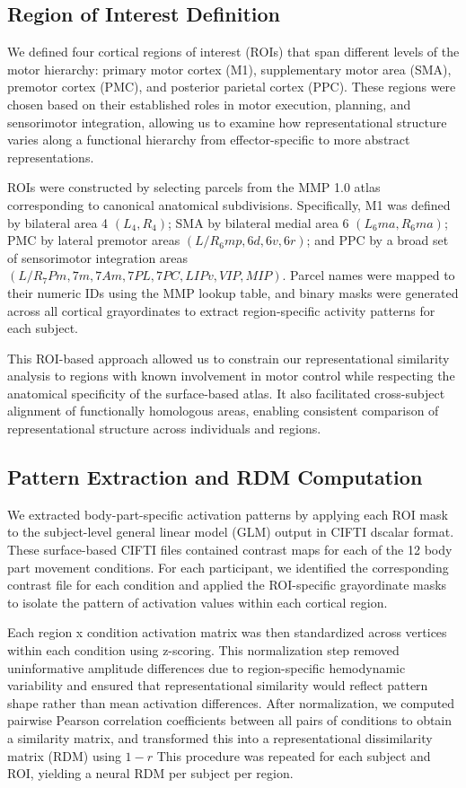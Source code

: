 \documentclass{article}
\begin{document}
\subsection{Region of Interest Definition}
We defined four cortical regions of interest (ROIs) that span different levels of the motor hierarchy: primary motor cortex (M1), supplementary motor area (SMA), premotor cortex (PMC), and posterior parietal cortex (PPC). These regions were chosen based on their established roles in motor execution, planning, and sensorimotor integration, allowing us to examine how representational structure varies along a functional hierarchy from effector-specific to more abstract representations.

ROIs were constructed by selecting parcels from the MMP 1.0 atlas corresponding to canonical anatomical subdivisions. Specifically, M1 was defined by bilateral area 4 $(L_4, R_4)$; SMA by bilateral medial area 6 $(L_6ma, R_6ma)$; PMC by lateral premotor areas $(L/R_6mp, 6d, 6v, 6r)$; and PPC by a broad set of sensorimotor integration areas $(L/R_7Pm, 7m, 7Am, 7PL, 7PC, LIPv, VIP, MIP)$. Parcel names were mapped to their numeric IDs using the MMP lookup table, and binary masks were generated across all cortical grayordinates to extract region-specific activity patterns for each subject.

This ROI-based approach allowed us to constrain our representational similarity analysis to regions with known involvement in motor control while respecting the anatomical specificity of the surface-based atlas. It also facilitated cross-subject alignment of functionally homologous areas, enabling consistent comparison of representational structure across individuals and regions.

\subsection{Pattern Extraction and RDM Computation}
We extracted body-part-specific activation patterns by applying each ROI mask to the subject-level general linear model (GLM) output in CIFTI dscalar format. These surface-based CIFTI files contained contrast maps for each of the 12 body part movement conditions. For each participant, we identified the corresponding contrast file for each condition and applied the ROI-specific grayordinate masks to isolate the pattern of activation values within each cortical region.

Each region x condition activation matrix was then standardized across vertices within each condition using z-scoring. This normalization step removed uninformative amplitude differences due to region-specific hemodynamic variability and ensured that representational similarity would reflect pattern shape rather than mean activation differences. After normalization, we computed pairwise Pearson correlation coefficients between all pairs of conditions to obtain a similarity matrix, and transformed this into a representational dissimilarity matrix (RDM) using $1-r$ This procedure was repeated for each subject and ROI, yielding a neural RDM per subject per region.
\end{document}
